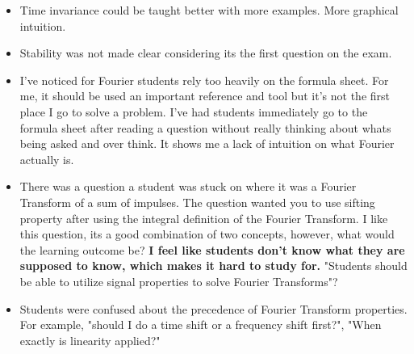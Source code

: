 \documentclass[12pt]{article}
\begin{document}
\begin{itemize}
    \item Time invariance could be taught better with more examples. More graphical intuition.
    \item Stability was not made clear considering its the first question on the exam.
    \item I've noticed for Fourier students rely too heavily on the formula sheet. For me, it should be used an important reference and tool but it's not the first place I go to solve a problem. I've had students immediately go to the formula sheet after reading a question without really thinking about whats being asked and over think. It shows me a lack of intuition on what Fourier actually is.
    \item There was a question a student was stuck on where it was a Fourier Transform of a sum of impulses. The question wanted you to use sifting property after using the integral definition of the Fourier Transform. I like this question, its a good combination of two concepts, however, what would the learning outcome be? \textbf{I feel like students don't know what they are supposed to know, which makes it hard to study for.} "Students should be able to utilize signal properties to solve Fourier Transforms"?
    \item Students were confused about the precedence of Fourier Transform properties. For example, "should I do a time shift or a frequency shift first?", "When exactly is linearity applied?"
\end{itemize}
\end{document}
